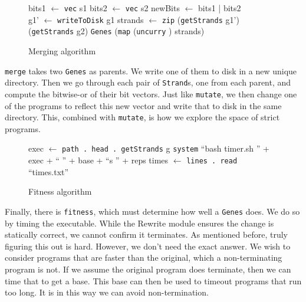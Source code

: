 \documentclass[preprint,nocopyrightspace]{sigplanconf}
\begin{document}
\begin{figure}[t]
\begin{algorithmic}

\State bits1 $\gets$ \lstinline!vec! s1
\State bits2 $\gets$ \lstinline!vec! s2
\State newBits $\gets$ bits1 | bits2
\State\Return{}
\EndFunction\\
\State g1' $\gets$ \lstinline !writeToDisk! g1
\State strands $\gets$ \lstinline!zip! (\lstinline!getStrands! g1') (\lstinline!getStrands! g2)
\State\Return\lstinline!Genes! (\lstinline!map! (\lstinline!uncurry! ) strands)
\EndFunction
\end{algorithmic}
\caption{Merging algorithm}
\label{alg:merge}
\end{figure}

\lstinline!merge! takes two \lstinline!Genes! as parents. We write one of them to disk in a new unique directory. Then we go through each pair of \lstinline!Strand!s, one from each parent, and compute the bitwise-or of their bit vectors. Just like \lstinline!mutate!, we then change one of the programs to reflect this new vector and write that to disk in the same directory. This, combined with \lstinline!mutate!, is how we explore the space of strict programs.

\begin{figure}[t]
\begin{algorithmic}
\State exec $\gets$ \lstinline!path . head . getStrands! g
\State{}
\State\lstinline!system! ``bash timer.sh '' + exec + `` '' + base + ``s '' + reps
\State times $\gets$ \lstinline!lines . read! ``times.txt''
\State\Return{}
\EndFunction
\end{algorithmic}
\caption{Fitness algorithm}
\label{alg:fitness}
\end{figure}

Finally, there is \lstinline!fitness!, which must determine how well a \lstinline!Genes! does. We do so by timing the executable. While the Rewrite module ensures the change is statically correct, we cannot confirm it terminates. As mentioned before, truly figuring this out is hard. However, we don't need the exact answer. We wish to consider programs that are faster than the original, which a non-terminating program is not. If we assume the original program does terminate, then we can time that to get a base. This base can then be used to timeout programs that run too long. It is in this way we can avoid non-termination.
\end{document}

